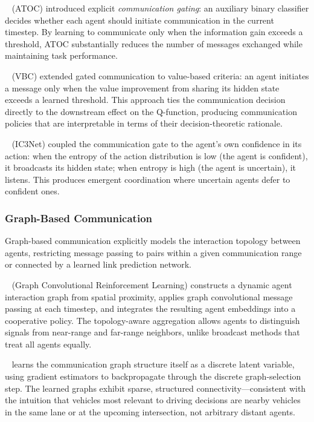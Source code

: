 \documentclass[12pt, a4paper]{article}
\begin{document}
\citeauthor{jiang2018learning}~\cite{jiang2018learning} (ATOC) introduced
explicit \emph{communication gating}: an auxiliary binary classifier decides
whether each agent should initiate communication in the current timestep.
By learning to communicate only when the information gain exceeds a threshold,
ATOC substantially reduces the number of messages exchanged while maintaining
task performance.

\citeauthor{wang2021vbc}~\cite{wang2021vbc} (VBC) extended gated communication
to value-based criteria: an agent initiates a message only when the value
improvement from sharing its hidden state exceeds a learned threshold.  This
approach ties the communication decision directly to the downstream effect on
the Q-function, producing communication policies that are interpretable in
terms of their decision-theoretic rationale.

\citeauthor{singh2019learning}~\cite{singh2019learning} (IC3Net) coupled the
communication gate to the agent's own confidence in its action: when the entropy
of the action distribution is low (the agent is confident), it broadcasts its
hidden state; when entropy is high (the agent is uncertain), it listens.  This
produces emergent coordination where uncertain agents defer to confident ones.

\subsubsection{Graph-Based Communication}

Graph-based communication explicitly models the interaction topology between
agents, restricting message passing to pairs within a given communication
range or connected by a learned link prediction network.

\citeauthor{jiang2019graph}~\cite{jiang2019graph} (Graph Convolutional
Reinforcement Learning) constructs a dynamic agent interaction graph from
spatial proximity, applies graph convolutional message passing at each
timestep, and integrates the resulting agent embeddings into a cooperative
policy.  The topology-aware aggregation allows agents to distinguish signals
from near-range and far-range neighbors, unlike broadcast methods that treat
all agents equally.

\citeauthor{kim2019learning}~\cite{kim2019learning} learns the communication
graph structure itself as a discrete latent variable, using gradient estimators
to backpropagate through the discrete graph-selection step.  The learned graphs
exhibit sparse, structured connectivity---consistent with the intuition that
vehicles most relevant to driving decisions are nearby vehicles in the same lane
or at the upcoming intersection, not arbitrary distant agents.
\end{document}

